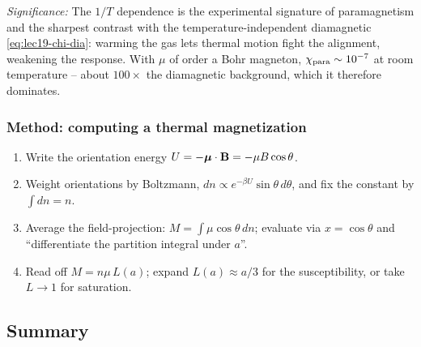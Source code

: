 \textit{Significance:} The $1/T$ dependence is the experimental signature of paramagnetism
and the sharpest contrast with the temperature-independent diamagnetic
\eqref{eq:lec19-chi-dia}: warming the gas lets thermal motion fight the alignment, weakening
the response. With $\mu$ of order a Bohr magneton, $\chi_{\rm para}\sim10^{-7}$ at room
temperature -- about $100\times$ the diamagnetic background, which it therefore dominates.


\subsubsection*{Method: computing a thermal magnetization}
\begin{enumerate}
  \item Write the orientation energy $U=-\boldsymbol{\mu}\cdot\mathbf{B}=-\mu B\cos\theta$.
  \item Weight orientations by Boltzmann, $dn\propto e^{-\beta U}\sin\theta\,d\theta$, and
        fix the constant by $\int dn=n$.
  \item Average the field-projection: $M=\int\mu\cos\theta\,dn$; evaluate via $x=\cos\theta$
        and ``differentiate the partition integral under $a$''.
  \item Read off $M=n\mu\,L(a)$; expand $L(a)\approx a/3$ for the susceptibility, or take
        $L\to1$ for saturation.
\end{enumerate}

\subsection{Summary}\label{subsec:lec19-summary}

